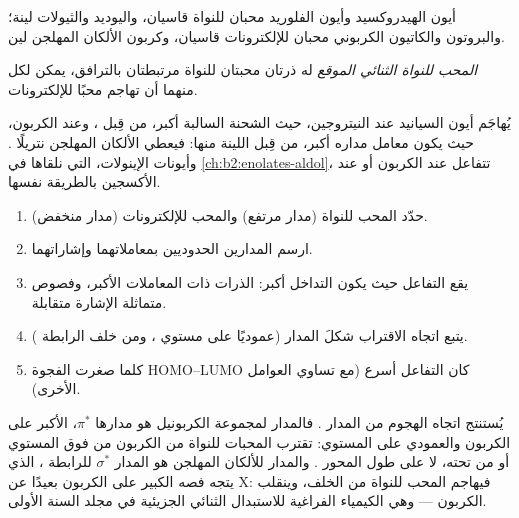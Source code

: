 أيون الهيدروكسيد وأيون الفلوريد محبان للنواة قاسيان، واليوديد والثيولات
لينة؛ والبروتون والكاتيون الكربوني محبان للإلكترونات قاسيان، وكربون
الألكان المهلجن لين.

\begin{definition}\label{def:b2:frontier-orbitals:ambident}
\emph{المحب للنواة الثنائي الموقع} له ذرتان محبتان للنواة
مرتبطتان بالترافق، يمكن لكل منهما أن تهاجم محبًا للإلكترونات.
\end{definition}

يُهاجَم أيون السيانيد عند النيتروجين، حيث الشحنة السالبة أكبر، من قِبل ، وعند الكربون، حيث يكون معامل مداره  أكبر، من قِبل اللينة منها:
فيعطي الألكان المهلجن نتريلًا . وأيونات الإينولات، التي نلقاها في
\cref{ch:b2:enolates-aldol}، تتفاعل عند الكربون أو عند الأكسجين بالطريقة نفسها.

\begin{method}\label{met:b2:frontier-orbitals:fmo}
\begin{enumerate}
  \item حدّد المحب للنواة (مدار  مرتفع) والمحب للإلكترونات (مدار  منخفض).
  \item ارسم المدارين الحدوديين بمعاملاتهما وإشاراتهما.
  \item يقع التفاعل حيث يكون التداخل أكبر: الذرات ذات المعاملات
        الأكبر، وفصوص متماثلة الإشارة متقابلة.
  \item يتبع اتجاه الاقتراب شكلَ المدار  (عموديًا على مستوي
        ، ومن خلف الرابطة ).
  \item كلما صغرت الفجوة HOMO--LUMO كان التفاعل أسرع (مع تساوي العوامل الأخرى).
\end{enumerate}
\end{method}

يُستنتج اتجاه الهجوم من المدار . فالمدار  لمجموعة الكربونيل هو
مدارها $\pi^*$، الأكبر على الكربون والعمودي على المستوي: تقترب المحبات للنواة من
الكربون من فوق المستوي أو من تحته، لا على طول المحور . والمدار 
للألكان المهلجن هو المدار $\sigma^*$ للرابطة ، الذي يتجه فصه الكبير على الكربون
بعيدًا عن X: فيهاجم المحب للنواة من الخلف، وينقلب الكربون
--- وهي الكيمياء الفراغية للاستبدال الثنائي الجزيئية في مجلد السنة الأولى.

